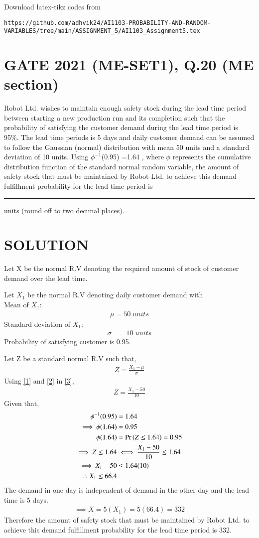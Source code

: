 \documentclass[journal,12pt,twocolumn]{IEEEtran}
\begin{document}
%
Download latex-tikz codes from 
%
\begin{lstlisting}
https://github.com/adhvik24/AI1103-PROBABILITY-AND-RANDOM-VARIABLES/tree/main/ASSIGNMENT_5/AI1103_Assignment5.tex
\end{lstlisting}
\section{GATE 2021 (ME-SET1), Q.20 (ME section)}
Robot Ltd. wishes to maintain enough safety
stock during the lead time period between
starting a new production run and its completion
such that the probability of satisfying the
customer demand during the lead time period
is 95\%. The lead time periods is 5 days and
daily customer demand can be assumed to follow
the Gaussian (normal) distribution with mean
50 units and a standard deviation of 10 units.
Using $\phi^{-1}$(0.95) =1.64 , where $\phi$ represents the
cumulative distribution function of the standard
normal random variable, the amount of safety
stock that must be maintained by Robot Ltd. to
achieve this demand fulfillment probability for
the lead time period is \rule{1cm}{0.15mm}  units (round off to
two decimal places).
\section{SOLUTION}
Let X be the normal R.V denoting the required amount of stock of customer demand over the lead time. 

Let $X_1$ be the normal R.V denoting daily customer demand with 
\\Mean of $X_1$:
\begin{align}
  \mu=50\;units\label{1}
\end{align}
Standard deviation of $X_1$:
\begin{align}
   \sigma &= 10\;units\label{2}
\end{align}
Probability of satisfying customer is 0.95.

Let Z be a standard normal R.V such that,
\begin{align}
    Z=\frac{X_1-\mu}{\sigma} \label{3}
\end{align}
Using \eqref{1} and \eqref{2} in \eqref{3},
\begin{align}
    Z=\frac{X_1-50}{10}\label{4}
\end{align}
Given that,
\begin{align}
    \phi^{-1}(0.95)&=1.64\\
    \implies \phi(1.64)&=0.95\\
    \phi(1.64)&=\Pr\left(Z\le1.64\right)=0.95\\
    \implies Z\le1.64&\iff\frac{X_1-50}{10}\le1.64\\
    \implies X_1-50 &\le 1.64(10)\\
    \therefore X_1\le66.4
\end{align}
The demand in one day is independent of demand in the other day and the lead time is 5 days.
\begin{align}
    \implies X=5(X_1)=5(66.4)=332
\end{align}
Therefore the amount of safety
stock that must be maintained by Robot Ltd. to
achieve this demand fulfillment probability for
the lead time period is 332.
\end{document}
